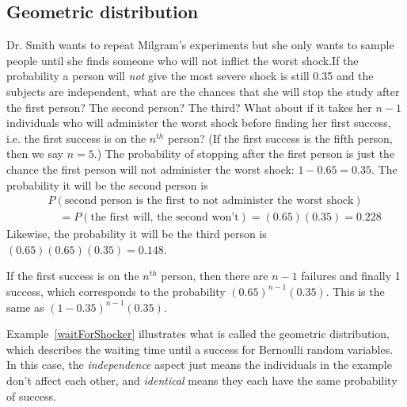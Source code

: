 
\subsection{Geometric distribution}


\begin{examplewrap}
\begin{nexample}{Dr. Smith wants to repeat Milgram's experiments but she only wants to sample people until she finds someone who will not inflict the worst shock.\footnotemark If the probability a person will \emph{not} give the most severe shock is still 0.35 and the subjects are independent, what are the chances that she will stop the study after the first person? The second person? The third? What about if it takes her $n-1$ individuals who will administer the worst shock before finding her first success, i.e. the first success is on the $n^{th}$ person? (If the first success is the fifth person, then we say $n=5$.)} \label{waitForShocker}
The probability of stopping after the first person is just the chance the first person will not administer the worst shock: $1-0.65=0.35$. The probability it will be the second person is
\begin{eqnarray*}
&&P(\text{second person is the first to not administer the worst shock}) \\
&&\quad = P(\text{the first will, the second won't}) = (0.65)(0.35) = 0.228
\end{eqnarray*}
Likewise, the probability it will be the third person is $(0.65)(0.65)(0.35) = 0.148$.

If the first success is on the $n^{th}$ person, then there are $n-1$ failures and finally 1 success, which corresponds to the probability $(0.65)^{n-1}(0.35)$. This is the same as $(1-0.35)^{n-1}(0.35)$.
\end{nexample}
\end{examplewrap}

Example~\ref{waitForShocker} illustrates what is called the geometric distribution, which describes the waiting time until a success for  Bernoulli random variables. In this case, the \emph{independence} aspect just means the individuals in the example don't affect each other, and \emph{identical} means they each have the same probability of success.

